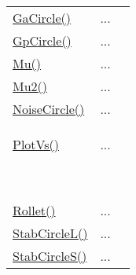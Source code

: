 \textcolor{blue}{}\begin{tabular}{>{\raggedleft}b{3cm}>{\centering}b{0.5cm}>{\raggedright}b{12cm}}
\textcolor{blue}{\hyperlink{GaCircle}{GaCircle()}}&
...&
 \begin{NoHyper} \nameref{par:GaCircle} \end{NoHyper}\tabularnewline
\textcolor{blue}{\hyperlink{GpCircle}{GpCircle()}}&
...&
 \begin{NoHyper} \nameref{par:GpCircle} \end{NoHyper}\tabularnewline
\textcolor{blue}{\hyperlink{Mu}{Mu()}}&
...&
 \begin{NoHyper} \nameref{par:Mu-stability-factor} \end{NoHyper}\tabularnewline
\textcolor{blue}{\hyperlink{Mu2}{Mu2()}}&
...&
 \begin{NoHyper} \nameref{par:Mu2-stability-factor} \end{NoHyper}\tabularnewline
\textcolor{blue}{\hyperlink{NoiseCircle}{NoiseCircle()}}&
...&
 \begin{NoHyper} \nameref{par:NoiseCircle} \end{NoHyper}\tabularnewline
\textcolor{blue}{\hyperlink{PlotVs}{PlotVs()}}

\textcolor{blue}{~}&
...

\textcolor{blue}{~}&
 \begin{NoHyper} \nameref{par:PlotVs} \end{NoHyper}\tabularnewline
\textcolor{blue}{\hyperlink{Rollet}{Rollet()}}&
...&
 \begin{NoHyper} \nameref{par:Rollet-stability-factor} \end{NoHyper}\tabularnewline
\textcolor{blue}{\hyperlink{StabCircleL}{StabCircleL()}}&
...&
 \begin{NoHyper} \nameref{par:StabCircleL} \end{NoHyper}\tabularnewline
\textcolor{blue}{\hyperlink{StabCircleS}{StabCircleS()}}&
...&
 \begin{NoHyper} \nameref{par:StabCircleS} \end{NoHyper}\tabularnewline
\end{tabular}
% 
